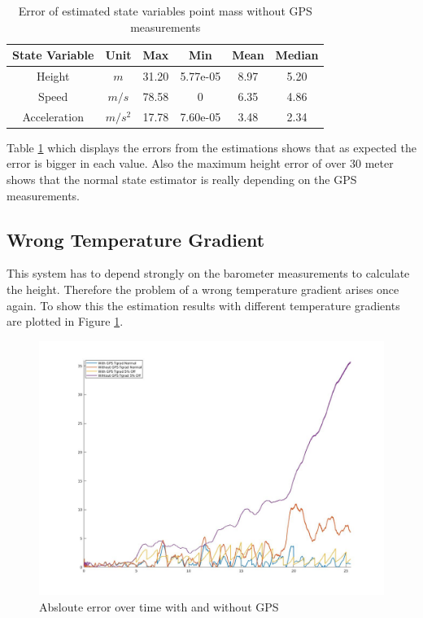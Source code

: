 \begin{table}[h!]
\centering
\begin{tabular}{cccccc}
\hline
\multicolumn{1}{|c|}{State Variable} & \multicolumn{1}{c|}{Unit} & \multicolumn{1}{c|}{Max} & \multicolumn{1}{c|}{Min} & \multicolumn{1}{c|}{Mean} & \multicolumn{1}{c|}{Median} \\ \hline
Height                            & $m$                         & 31.20                  & 5.77e-05                 & 8.97                    & 5.20                      \\
Speed                             & $m/s$                       & 78.58                  & 0                        & 6.35                    & 4.86                      \\
Acceleration                       & $m/s^2$   			& 17.78                  & 7.60e-05                 & 3.48                    & 2.34
\end{tabular}
\caption{Error of estimated state variables point mass without GPS measurements}
\label{tab:ErrorPointMassWithoutGPS}
\end{table}

Table \ref{tab:ErrorPointMassWithoutGPS} which displays the errors from the estimations shows that as expected the error is bigger in each value.
Also the maximum height error of over 30 meter shows that the normal state estimator is really depending on the GPS measurements.

\newpage
\subsection{Wrong Temperature Gradient}
This system has to depend strongly on the barometer measurements to calculate the height.
Therefore the problem of a wrong temperature gradient arises once again.
To show this the estimation results with different temperature gradients are plotted in Figure \ref{fig:PointMassWithWithoutGPS}.

\begin{figure}[h!]
 \centering
 \includegraphics[width=.8\textwidth]{./Pictures/PointMassWithWithoutGPS.jpg}
 \caption{Absloute error over time with and without GPS}
 \label{fig:PointMassWithWithoutGPS}
\end{figure}

